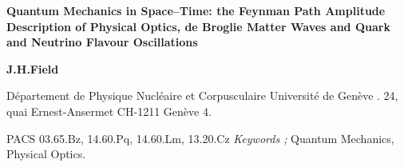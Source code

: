 \begin{titlepage}
\begin{center}
\vspace*{2cm}
{\large \bf Quantum Mechanics in Space--Time: the Feynman Path Amplitude Description
  of Physical Optics, de Broglie Matter Waves and Quark and Neutrino Flavour Oscillations}
\vspace*{1.5cm}
\end{center}
\begin{center}
{\bf J.H.Field }
\end{center}
\begin{center}
{ 
D\'{e}partement de Physique Nucl\'{e}aire et Corpusculaire
 Universit\'{e} de Gen\`{e}ve . 24, quai Ernest-Ansermet
 CH-1211 Gen\`{e}ve 4.
}
\end{center}
\vspace*{2cm}
\begin{abstract}
  Feynman's laws of quantum dynamics are concisely stated, discussed in 
  comparison with other formulations of quantum mechanics and applied to selected 
  problems in the physical optics of photons and massive particles as well as
 flavour oscillations. The classical wave theory of light is derived from these laws
 for the case in which temporal variation of path amplitudes may be neglected, whereas specific
  experiments, sensitive to the temporal properties of path amplitudes, are suggested. 
  The reflection coefficient of light from the surface of a transparent medium is found
  to be markedly different to that predicted by the classical Fresnel formula. Except
  for neutrino oscillations, good agreement is otherwise found with previous calculations of
  spatially dependent quantum interference effects.             
\end{abstract}
\vspace*{1cm}
PACS 03.65.Bz, 14.60.Pq, 14.60.Lm, 13.20.Cz 
\newline
{\it Keywords ;} Quantum Mechanics,
Physical Optics.
\end{titlepage}
  

